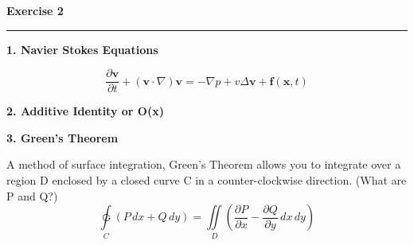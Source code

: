 \documentclass{article}
\begin{document}
\newpage
\noindent \textbf{Exercise 2}

\noindent \rule{\textwidth}{.1mm}

\begin{center}
\textbf{1. Navier Stokes Equations}
\end{center}

\begin{equation*}
\frac{\partial \mathbf{v}}{\partial t} + \left( \mathbf{v} \cdot \nabla \right) \mathbf{v} =  - \nabla p + v \Delta \mathbf{v} + \mathbf{f}\left( \mathbf{x}, t\right)
\end{equation*}

\begin{center}
\textbf{2. Additive Identity or O(x)}
\end{center}

\begin{center}
\textbf{3. Green's Theorem}
\end{center}

A method of surface integration, Green's Theorem allows you to integrate over a region D enclosed by a closed curve C in a counter-clockwise direction. (What are P and Q?)
\begin{equation*}
\ointctrclockwise\limits_C \left( P \, dx + Q \, dy \right) = \iint\limits_D \left( \frac{\partial P}{\partial x} - \frac{\partial Q}{\partial y} \, dx \, dy \right)
\end{equation*}
\end{document}
